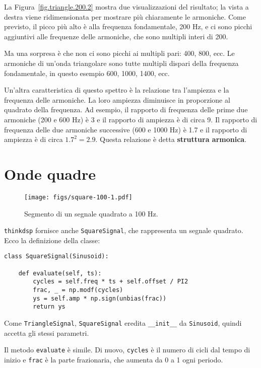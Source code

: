 \documentclass[12pt,a4paper]{book}
\begin{document}
La Figura~\ref{fig.triangle.200.2} mostra due visualizzazioni del risultato; la vista a destra viene ridimensionata per mostrare più chiaramente le armoniche. Come previsto, il picco più alto è alla frequenza fondamentale, 200 Hz, e ci sono picchi aggiuntivi alle frequenze delle armoniche, che sono multipli interi di 200.

Ma una sorpresa è che non ci sono picchi ai multipli pari: 400, 800, ecc. Le armoniche di un'onda triangolare sono tutte multipli dispari della frequenza fondamentale, in questo esempio 600, 1000, 1400, ecc.

Un'altra caratteristica di questo spettro è la relazione tra l'ampiezza e la frequenza delle armoniche. La loro ampiezza diminuisce in proporzione al quadrato della frequenza. Ad esempio, il rapporto di frequenza delle prime due armoniche (200 e 600 Hz) è 3 e il rapporto di ampiezza è di circa 9. Il rapporto di frequenza delle due armoniche successive (600 e 1000 Hz) è 1.7 e il rapporto di ampiezza è di circa $1.7^2 = 2.9$. Questa relazione è detta {\bf struttura armonica}.

\section{Onde quadre} \label{square} 

\begin{figure} 

\centerline{\texttt{[image: figs/square-100-1.pdf]}} \caption{Segmento di un segnale quadrato a 100 Hz.} \label{fig.square.100.1} \end{figure} 

{\tt thinkdsp} fornisce anche {\tt SquareSignal}, che rappresenta un segnale quadrato. Ecco la definizione della classe:

\begin{verbatim} 
class SquareSignal(Sinusoid):

    def evaluate(self, ts):
        cycles = self.freq * ts + self.offset / PI2
        frac, _ = np.modf(cycles)
        ys = self.amp * np.sign(unbias(frac))
        return ys
 \end{verbatim} 

Come {\tt TriangleSignal}, {\tt SquareSignal} eredita \verb"__init__" da {\tt Sinusoid}, quindi accetta gli stessi parametri.

Il metodo {\tt evaluate} è simile. Di nuovo, {\tt cycles} è il numero di cicli dal tempo di inizio e {\tt frac} è la parte frazionaria, che aumenta da 0 a 1 ogni periodo.
\end{document}
